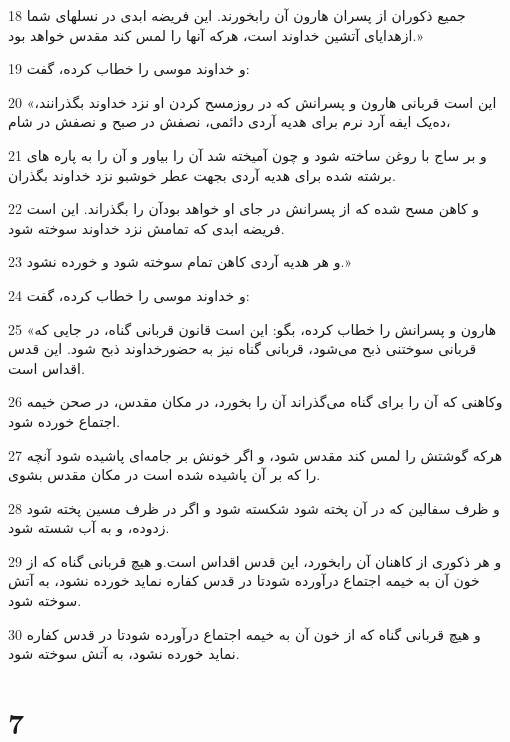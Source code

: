 \par 18 جمیع ذکوران از پسران هارون آن رابخورند. این فریضه ابدی در نسلهای شما ازهدایای آتشین خداوند است، هر‌که آنها را لمس کند مقدس خواهد بود.»
\par 19 و خداوند موسی را خطاب کرده، گفت:
\par 20 «این است قربانی هارون و پسرانش که در روزمسح کردن او نزد خداوند بگذرانند، ده‌یک ایفه آرد نرم برای هدیه آردی دائمی، نصفش در صبح و نصفش در شام،
\par 21 و بر ساج با روغن ساخته شود و چون آمیخته شد آن را بیاور و آن را به پاره های برشته شده برای هدیه آردی بجهت عطر خوشبو نزد خداوند بگذران.
\par 22 و کاهن مسح شده که از پسرانش در جای او خواهد بودآن را بگذراند. این است فریضه ابدی که تمامش نزد خداوند سوخته شود.
\par 23 و هر هدیه آردی کاهن تمام سوخته شود و خورده نشود.»
\par 24 و خداوند موسی را خطاب کرده، گفت:
\par 25 «هارون و پسرانش را خطاب کرده، بگو: این است قانون قربانی گناه، در جایی که قربانی سوختنی ذبح می‌شود، قربانی گناه نیز به حضورخداوند ذبح شود. این قدس اقداس است.
\par 26 وکاهنی که آن را برای گناه می‌گذراند آن را بخورد، در مکان مقدس، در صحن خیمه اجتماع خورده شود.
\par 27 هر‌که گوشتش را لمس کند مقدس شود، و اگر خونش بر جامه‌ای پاشیده شود آنچه را که بر آن پاشیده شده است در مکان مقدس بشوی.
\par 28 و ظرف سفالین که در آن پخته شود شکسته شود و اگر در ظرف مسین پخته شود زدوده، و به آب شسته شود.
\par 29 و هر ذکوری از کاهنان آن رابخورد، این قدس اقداس است.و هیچ قربانی گناه که از خون آن به خیمه اجتماع درآورده شودتا در قدس کفاره نماید خورده نشود، به آتش سوخته شود.
\par 30 و هیچ قربانی گناه که از خون آن به خیمه اجتماع درآورده شودتا در قدس کفاره نماید خورده نشود، به آتش سوخته شود.
 
\chapter{7}


